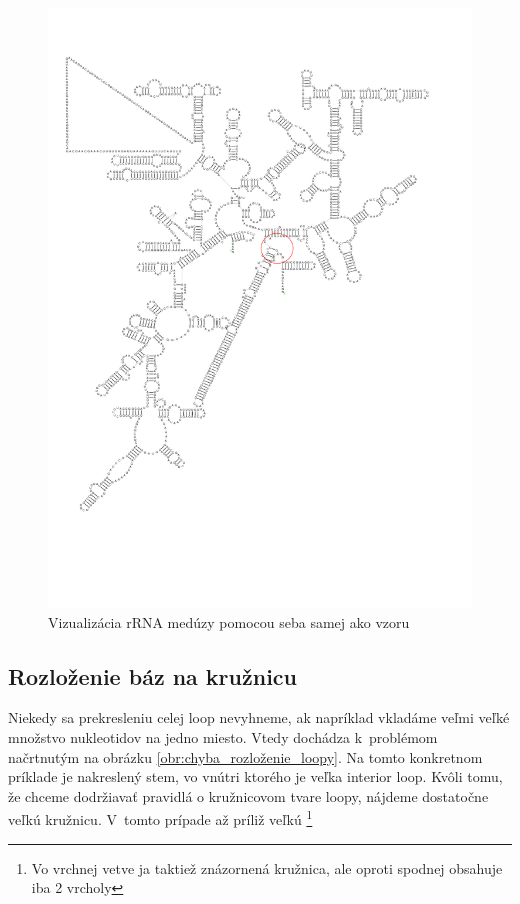 \begin{figure}
  \includegraphics[clip, trim=0 4cm 2cm 2cm, width=1\textwidth]{../img/chyby/tripedalia_cystophora-tripedalia_cystophora}
  \caption{Vizualizácia rRNA medúzy pomocou seba samej ako vzoru}
  \label{obr:chyba_otocenie_vetvy}
\end{figure}

\subsection{Rozloženie báz na kružnicu}

Niekedy sa prekresleniu celej loop nevyhneme, ak napríklad vkladáme veľmi veľké množstvo nukleotidov na jedno
miesto. Vtedy dochádza k~problémom načrtnutým na obrázku \ref{obr:chyba_rozloženie_loopy}.
Na tomto konkretnom príklade je nakreslený stem, vo vnútri ktorého je veľka interior loop. Kvôli tomu,
že chceme dodržiavať pravidlá o kružnicovom tvare loopy, nájdeme dostatočne veľkú kružnicu.
V~tomto prípade až príliž veľkú%
\footnote{Vo vrchnej vetve ja taktiež znázornená kružnica, ale oproti spodnej obsahuje iba 2 vrcholy}

